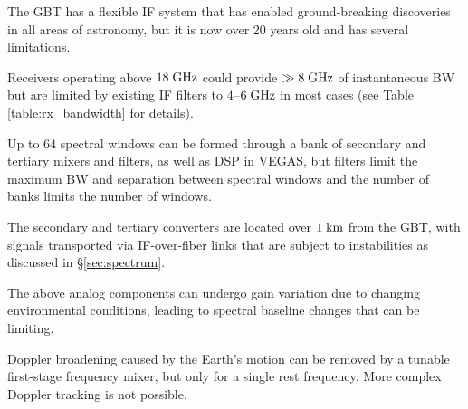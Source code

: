 \documentclass[10pt]{myNSF}
\begin{document}
\label{sec:GBT_upgrades}

The GBT has a flexible IF system that has enabled ground-breaking
discoveries in all areas of astronomy, but it is now over 20 years old
and has several limitations.
\vspace{-1.0em}
\begin{itemize*}
\item{Receivers operating above $18\; \textrm{GHz}$ could provide $\gg 8\;
  \textrm{GHz}$ of instantaneous BW but are limited by existing IF filters to
  $4$--$6\; \textrm{GHz}$ in most cases (see Table \ref{table:rx_bandwidth}
  for details).}
\item{Up to 64 spectral windows can be formed through a bank of
  secondary and tertiary mixers and filters, as well as DSP in VEGAS,
  but filters limit the maximum BW and separation between spectral
  windows and the number of banks limits the number of windows.}
\item{The secondary and tertiary converters are located over $1\; \textrm{km}$
  from the GBT, with signals transported via IF-over-fiber links that
  are subject to instabilities as discussed in \S\ref{sec:spectrum}.}
\item{The above analog components can undergo gain variation due to
  changing environmental conditions, leading to spectral baseline
  changes that can be limiting.}
\item{Doppler broadening caused by the Earth's motion can be removed
  by a tunable first-stage frequency mixer, but only for a single rest
  frequency.  More complex Doppler tracking is not possible.}
\end{itemize*}
\vspace{-1.0em}
\end{document}
